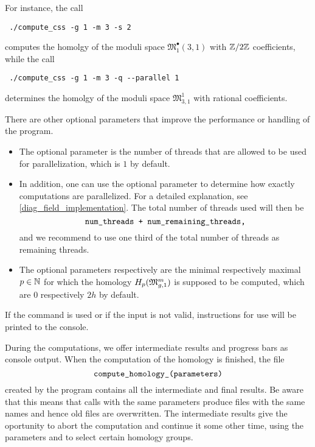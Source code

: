 For instance, the call
\begin{lstlisting}
 ./compute_css -g 1 -m 3 -s 2
\end{lstlisting}
computes the homolgy of the moduli space $\mathfrak{M}^\bullet_1(3, 1)$ with $\Z/2\Z$ coefficients, 
while the call
\begin{lstlisting}
 ./compute_css -g 1 -m 3 -q --parallel 1
\end{lstlisting}
determines the homolgy of the moduli space $\mathfrak{M}^1_{3, 1}$ with rational coefficients.

There are other optional parameters that improve the performance or handling of the program.
\begin{itemize}
\item The optional parameter  is the number of threads 
      that are allowed to be used for parallelization,
      which is $1$ by default. 
\item In addition, one can use the optional parameter 
      to determine how exactly computations are parallelized. 
      For a detailed explanation, see \ref{diag_field_implementation}.
      The total number of threads used will then be 
      \[
        \text{\progname{num\_threads + num\_remaining\_threads,}}
      \]
      and we recommend to use one third of the total number of threads as remaining threads.
\item The optional parameters  respectively  are the minimal respectively maximal $p \in \N$ 
      for which the homology $H_p(\Modspc[1])$ is supposed to be computed,
      which are $0$ respectively $2h$ by default.
\end{itemize}

If the command  is used or if the input is not valid,
instructions for use will be printed to the console.

During the computations, we offer intermediate results and progress bars as console output. 
When the computation of the homology is finished, 
the file 
\[
\text{\progname{compute\_homology\_(parameters)}}
\]
created by the program contains all the intermediate and final results.
Be aware that this means that calls with the same parameters produce files with the same names and hence old files are overwritten.
The intermediate results give the oportunity to abort the computation
and continue it some other time, 
using the parameters  and  to select certain homology groups.

